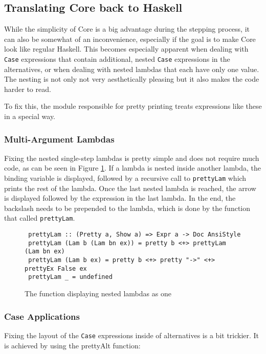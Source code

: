 \subsection{Translating Core back to Haskell}
While the simplicity of Core is a big advantage during the stepping process,
it can also be somewhat of an inconvenience,
especially if the goal is to make Core look like regular Haskell.
This becomes especially apparent when dealing with \texttt{Case} expressions that contain additional, nested \texttt{Case} expressions in the alternatives,
or when dealing with nested lambdas that each have only one value.
The nesting is not only not very aesthetically pleasing but it also makes the code harder to read.

To fix this,
the module responsible for pretty printing treats expressions like these in a special way.

\subsubsection{Multi-Argument Lambdas}
Fixing the nested single-step lambdas is pretty simple and does not require much code,
as can be seen in Figure \ref*{fig:prettyLambda}.
If a lambda is nested inside another lambda,
the binding variable is displayed,
followed by a recursive call to \texttt{prettyLam} which prints the rest of the lambda.
Once the last nested lambda is reached,
the arrow is displayed followed by the expression in the last lambda.
In the end, the backslash needs to be prepended to the lambda,
which is done by the function that called \texttt{prettyLam}.

\begin{figure}[!ht]
\begin{verbatim}
 prettyLam :: (Pretty a, Show a) => Expr a -> Doc AnsiStyle
 prettyLam (Lam b (Lam bn ex)) = pretty b <+> prettyLam (Lam bn ex)
 prettyLam (Lam b ex) = pretty b <+> pretty "->" <+> prettyEx False ex
 prettyLam _ = undefined
\end{verbatim}
    \caption{The function displaying nested lambdas as one}
    \label{fig:prettyLambda}
\end{figure}

\subsubsection{Case Applications}
Fixing the layout of the \texttt{Case} expressions inside of alternatives is a bit trickier.
It is achieved by using the prettyAlt function:


